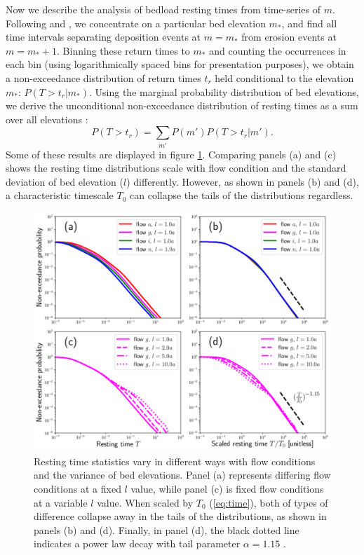 \documentclass[draft]{agujournal2018}
\newcommand\be{\begin{equation}} %
\newcommand\ee{\end{equation}}   %
\begin{document}
Now we describe the analysis of bedload resting times from time-series of $m$.
Following \citet{Voepel2013} and \citet{Martin2014}, we concentrate on a particular bed elevation $m_\ast$, and find all time intervals separating deposition events at $m=m_\ast$ from erosion events at $m=m_\ast+1$.
Binning these return times to $m_\ast$ and counting the occurrences in each bin (using logarithmically spaced bins for presentation purposes), we obtain a non-exceedance distribution of return times $t_r$ held conditional to the elevation $m_\ast$: $P(T>t_r|m_\ast)$.
Using the marginal probability distribution of bed elevations, we derive the unconditional non-exceedance distribution of resting times as a sum over all elevations \citep{Yang1971, Nakagawa1980, Voepel2013, Martin2014}:
\be P(T>t_r) = \sum_{m'} P(m') P(T>t_r|m') .\ee
Some of these results are displayed in figure \ref{fig:cdfs}.
Comparing panels (a) and (c) shows the resting time distributions scale with flow condition and the standard deviation of bed elevation ($l$) differently.
However, as shown in panels (b) and (d), a characteristic timescale $T_0$ can collapse the tails of the distributions regardless.
\begin{figure}[t!]
	\includegraphics[width=\linewidth,keepaspectratio]{./figures/montage1.pdf}
	\caption{Resting time statistics vary in different ways with flow conditions and the variance of bed elevations. Panel (a) represents differing flow conditions at a fixed $l$ value, while panel (c) is fixed flow conditions at a variable $l$ value. When scaled by $T_0$ (\ref{eq:time}), both of types of difference collapse away in the tails of the distributions, as shown in panels (b) and (d). Finally, in panel (d), the black dotted line indicates a power law decay with tail parameter $\alpha=1.15$ .}
	\label{fig:cdfs}
\end{figure}
\end{document}
